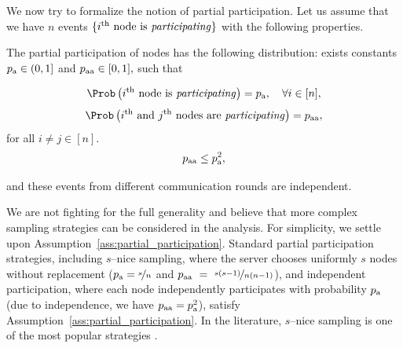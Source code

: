 \documentclass{article}
\newcommand*{\probavailable}{\ensuremath{p_{\textnormal{a}}}}
\newcommand*{\probpairaa}{\ensuremath{p_{\textnormal{aa}}}}
\begin{document}
We now try to formalize the notion of partial participation. Let us assume that we have $n$ events $\{i^{\textnormal{th}} \textnormal{ node is \textit{participating}}\}$ with the following properties.
\begin{assumption}
  \label{ass:partial_participation}
  The partial participation of nodes has the following distribution: exists constants $\probavailable \in (0, 1]$ and $\probpairaa \in [0, 1],$ such that
  \begin{enumerate}
    \Item \begin{align*}\Prob\left(i^{\textnormal{th}} \textnormal{ node is \textit{participating}}\right) = \probavailable, \quad \forall i \in [n],\end{align*}
    \Item \begin{align*}\Prob\left(i^{\textnormal{th}} \textnormal{ and } j^{\textnormal{th}} \textnormal{ nodes are \textit{participating}}\right) = \probpairaa,\end{align*}
      for all $i \neq j \in [n].$
    \Item \begin{align} \label{eq:partial_participation_constraint}
      \probpairaa \leq \probavailable^2,
    \end{align}
  \end{enumerate}
  and these events from different communication rounds are independent.
\end{assumption}

We are not fighting for the full generality and believe that more complex sampling strategies can be considered in the analysis. For simplicity, we settle upon Assumption~\ref{ass:partial_participation}. Standard partial participation strategies, including $s$--nice sampling, where the server chooses uniformly $s$ nodes without replacement ($\probavailable = \nicefrac{s}{n}$ and $\probpairaa~=~\nicefrac{s(s-1)}{n(n-1)}$),
and independent participation, where each node independently participates with probability $\probavailable$ (due to independence, we have $\probpairaa = \probavailable^2$), satisfy Assumption~\ref{ass:partial_participation}. In the literature, $s$--nice sampling is one of the most popular strategies \citep{zhao2021faster, richtarik2021ef21, reddi2020adaptive, konevcny2016federated}. 
\end{document}
